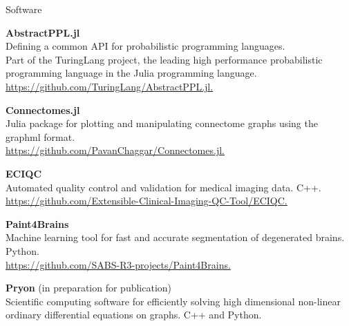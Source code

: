 \begin{rSection}{Software}

{\bf AbstractPPL.jl} \\
Defining a common API for probabilistic programming languages. \\
Part of the TuringLang project, the leading high performance probabilistic programming language
in the Julia programming language.
\href{https://github.com/TuringLang/AbstractPPL.jl}{https://github.com/TuringLang/AbstractPPL.jl.}

{\bf Connectomes.jl} \\
Julia package for plotting and manipulating connectome graphs using the graphml format. \\
\href{https://github.com/PavanChaggar/Connectomes.jl}{https://github.com/PavanChaggar/Connectomes.jl.}

{\bf ECIQC} \\
Automated quality control and validation for medical imaging data. C++.  \\
\href{https://github.com/Extensible-Clinical-Imaging-QC-Tool/ECIQC}{https://github.com/Extensible-Clinical-Imaging-QC-Tool/ECIQC.}

{\bf Paint4Brains} \\
Machine learning tool for fast and accurate segmentation of degenerated brains. Python. \\
\href{https://github.com/SABS-R3-projects/Paint4Brains}{https://github.com/SABS-R3-projects/Paint4Brains.}

{\bf Pryon} (in preparation for publication) \\
Scientific computing software for efficiently solving high dimensional non-linear ordinary differential equations on graphs. C++ and Python.

\end{rSection}